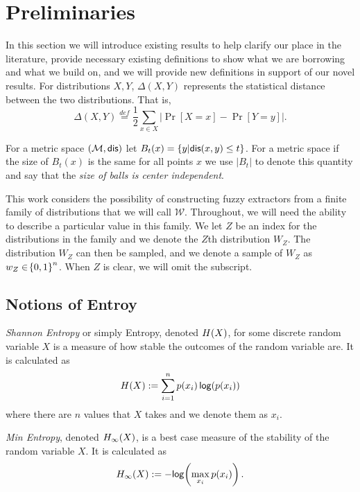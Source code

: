 
\section{Preliminaries}
In this section we will introduce existing results to help clarify our place in the literature, provide necessary existing definitions to show what we are borrowing and what we build on, and we will provide new definitions in support of our novel results.  For distributions $X, Y$, $\Delta(X, Y)$ represents the statistical distance between the two distributions.  That is, 
\[
\Delta(X, Y)\overset{def}= \frac{1}{2}\sum_{x \in X} \left| \Pr[X=x] - \Pr[Y=y]\right|.
\]

For a metric space $(\mathcal{M}, \mathsf{dis})$ let $B_t(x) = \{y | \mathsf{dis}(x, y)\le t\}$. For a metric space if the size of $B_t(x)$ is the same for all points $x$ we use $|B_t|$ to denote this quantity and say that the \emph{size of balls is center independent}.

This work considers the possibility of constructing fuzzy extractors from a finite family of distributions that we will call $\mathcal{W}$. 
Throughout, we will need the ability to describe a particular value in this family.  
We let $Z$ be an index for the distributions in the family and we denote the $Z$th distribution $W_Z$. 
The distribution $W_Z$ can then be sampled, and we denote a sample of $W_Z$ as $w_{Z} \in \!\left\{ 0,1 \right\}^{n}$. When $Z$ is clear, we will omit the subscript.

\subsection{Notions of Entroy}

\begin{definition}[Entropy]
    \emph{Shannon Entropy} or simply Entropy, denoted $H\!\left(X\right)$, for some discrete random variable $X$ is a measure of how stable the outcomes of the random variable are. It is calculated as \[H\!\left(X\right) := \sum\limits_{i=1}^n p\!\left(x_i\right)\mathsf{log}\!\left(p\!\left(x_i\right)\right)\] where there are $n$ values that $X$ takes and we denote them as $x_i$. 
\end{definition}

\begin{definition}
    \emph{Min Entropy}, denoted $H_{\infty}\!\left(X\right)$, is a best case measure of the stability of the random variable $X$. It is calculated as \[H_{\infty}\!\left(X\right) := -\mathsf{log}\!\left(\max\limits_{x_i} p(x_i)\right).\]  
\end{definition}

